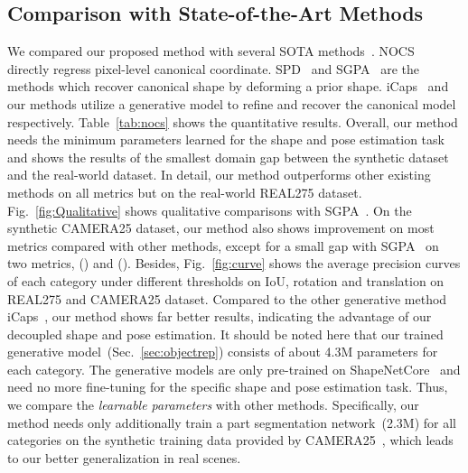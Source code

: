 \documentclass{article}
\begin{document}
\subsection{Comparison with State-of-the-Art Methods}
\label{ssec:compare_sota}
We compared our proposed method with several SOTA methods~\cite{NOCS,SPD,SGPA,lin2022sar,deng2022icaps}. NOCS~\cite{NOCS} directly regress pixel-level canonical coordinate. SPD~\cite{SPD} and SGPA~\cite{SGPA} are the methods which recover canonical shape by deforming a prior shape. iCaps~\cite{deng2022icaps} and our methods utilize a generative model to refine and recover the canonical model respectively. Table~\ref{tab:nocs} shows the quantitative results. Overall, our method needs the minimum parameters learned for the shape and pose estimation task and shows the results of the smallest domain gap between the synthetic dataset and the real-world dataset. 
In detail, 
our method outperforms other existing methods on all metrics but  on the real-world REAL275 dataset. Fig.~\ref{fig:Qualitative} shows qualitative comparisons with SGPA~\cite{SGPA}.
On the synthetic CAMERA25 dataset, our method also shows improvement on most metrics compared with other methods, except for a small gap with SGPA~\cite{SGPA} on two metrics, () and ().
Besides, Fig.~\ref{fig:curve} shows the average precision curves of each category under different thresholds on IoU, rotation and translation on REAL275 and CAMERA25 dataset.
Compared to the other generative method iCaps~\cite{deng2022icaps}, our method shows far better results, indicating the advantage of our decoupled shape and pose estimation.
It should be noted here that our trained generative model~(Sec.~\ref{sec:objectrep}) consists of about 4.3M parameters for each category. The generative models are only pre-trained on ShapeNetCore~\cite{chang2015shapenet} and need no more fine-tuning for the specific shape and pose estimation task. Thus, we compare the \textit{learnable parameters} with other methods. Specifically, our method needs only additionally train a part segmentation network~(2.3M) for all categories on the synthetic training data provided by CAMERA25~\cite{NOCS}, which leads to our better generalization in real scenes. 
\end{document}
